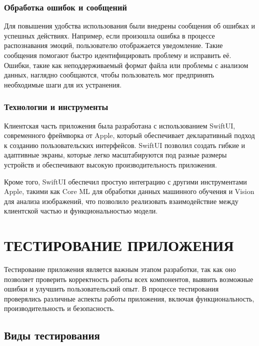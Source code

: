 {{    \subsubsection*{Обработка ошибок и сообщений}
    
    Для повышения удобства использования были внедрены сообщения об ошибках и успешных действиях. Например, если произошла ошибка в процессе распознавания эмоций, пользователю отображается уведомление. Такие сообщения помогают быстро идентифицировать проблему и исправить её. Ошибки, такие как неподдерживаемый формат файла или проблемы с анализом данных, наглядно сообщаются, чтобы пользователь мог предпринять необходимые шаги для их устранения.
    
    \subsubsection*{Технологии и инструменты}
    
    Клиентская часть приложения была разработана с использованием SwiftUI, современного фреймворка от Apple, который обеспечивает декларативный подход к созданию пользовательских интерфейсов. SwiftUI позволил создать гибкие и адаптивные экраны, которые легко масштабируются под разные размеры устройств и обеспечивают высокую производительность приложения.
    
    Кроме того, SwiftUI обеспечил простую интеграцию с другими инструментами Apple, такими как Core ML для обработки данных машинного обучения и Vision для анализа изображений, что позволило реализовать взаимодействие между клиентской частью и функциональностью модели.
    
}

\newpage

\section{\MakeUppercase{Тестирование приложения}}

Тестирование приложения является важным этапом разработки, так как оно позволяет проверить корректность работы всех компонентов, выявить возможные ошибки и улучшить пользовательский опыт. В процессе тестирования проверялись различные аспекты работы приложения, включая функциональность, производительность и безопасность.

\subsection{Виды тестирования}

}
